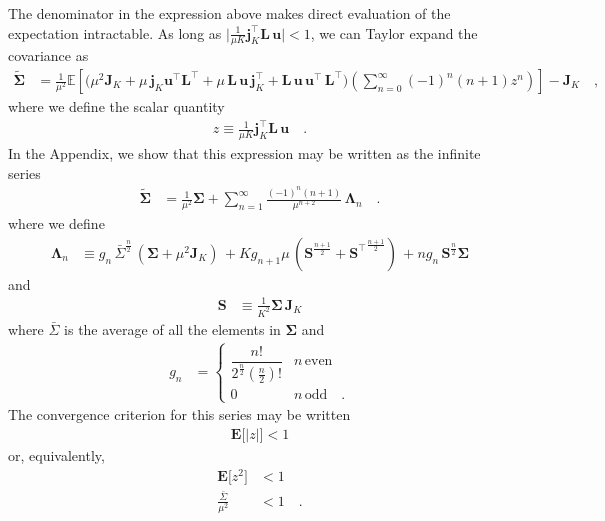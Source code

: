 \documentclass[modern]{aastex62}
\begin{document}
%
The denominator in the expression above makes direct evaluation of the expectation
intractable. As long as
$\big| \frac{1}{\mu K}\mathbf{j}_K^\top \mathbf{L} \, \mathbf{u} \big| < 1$, we
can Taylor expand the covariance as
%
\begin{align}
    \label{eq:SigmaTildeExp}
    \tilde{\pmb{\Sigma}}
     & =
    \frac{1}{\mu^2}
    \mathbb{E}\left[
        \Bigg(
        \mu^2 \mathbf{J}_K
        +
        \mu \, \mathbf{j}_K\mathbf{u}^\top \mathbf{L}^\top
        +
        \mu \, \mathbf{L} \, \mathbf{u} \, \mathbf{j}_K^\top
        +
        \mathbf{L} \, \mathbf{u} \, \mathbf{u}^\top \, \mathbf{L}^\top
        \Bigg)
        \left(
        \sum\limits_{n=0}^\infty
        (-1)^n (n + 1) z^n
        \right)
        \right]
    - \mathbf{J}_K
    \quad,
\end{align}
%
where we define the scalar quantity
%
\begin{align}
    z \equiv \frac{1}{\mu K}\mathbf{j}_K^\top \mathbf{L} \, \mathbf{u}
    \quad.
\end{align}
%
In the Appendix, we show that this expression may be written as
the infinite series
%
\begin{align}
    \tilde{\pmb{\Sigma}}
     & =
    \frac{1}{\mu^2} \pmb{\Sigma}
    +
    \sum\limits_{n=1}^\infty
    \frac{(-1)^n(n + 1)}{\mu^{n + 2}}
    \,
    \pmb{\Lambda}_n
    \quad.
\end{align}
%
where we define
%
\begin{align}
    \pmb{\Lambda}_n
     & \equiv
    g_n \, \bar{\Sigma}^\frac{n}{2} \, (\pmb{\Sigma} + \mu^2\mathbf{J}_K)
    \, +
    K g_{n+1} \mu  \,
    \left(
    \mathbf{S}^\frac{n + 1}{2}
    +
    {\mathbf{S}^\top}^\frac{n + 1}{2}
    \right)
    \, +
    n g_n \, \mathbf{S}^\frac{n}{2}\pmb{\Sigma}
\end{align}
%
and
%
\begin{align}
    \mathbf{S}
     & \equiv
    \frac{1}{K^2} \pmb{\Sigma} \, \mathbf{J}_K
\end{align}
%
where $\bar{\Sigma}$ is the average of all the elements in $\pmb{\Sigma}$ and
%
\begin{align}
    g_n
     & =
    \begin{cases}
        \dfrac{n!}{2^\frac{n}{2} \left(\frac{n}{2}\right)!} & n \, \mathrm{even}
        \\
        0                                                   & n \, \mathrm{odd}
        \quad.
    \end{cases}
\end{align}
%
The convergence criterion for this series may be written
%
\begin{align}
    \pmb{E}\big[|z|\big] < 1
\end{align}
%
or, equivalently,
%
\begin{align}
    \pmb{E}\big[z^2\big] &< 1
    \nonumber \\
    \frac{\bar{\Sigma}}{\mu^2} &< 1
    \quad.
\end{align}
%
\end{document}

